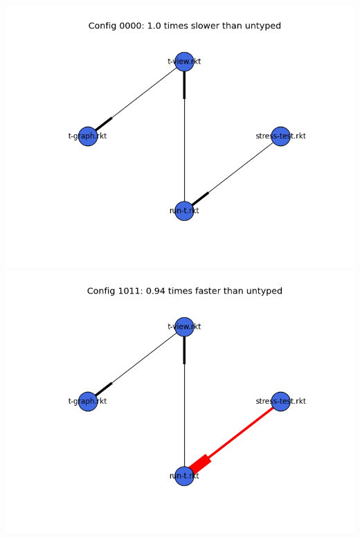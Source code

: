 \documentclass{article}
\begin{document}
\begin{itemize}
\includegraphics[width=\textwidth]{mbta-ben-module-graph-0000.png}
\includegraphics[width=\textwidth]{mbta-ben-module-graph-1011.png}
\end{itemize}
\end{document}
